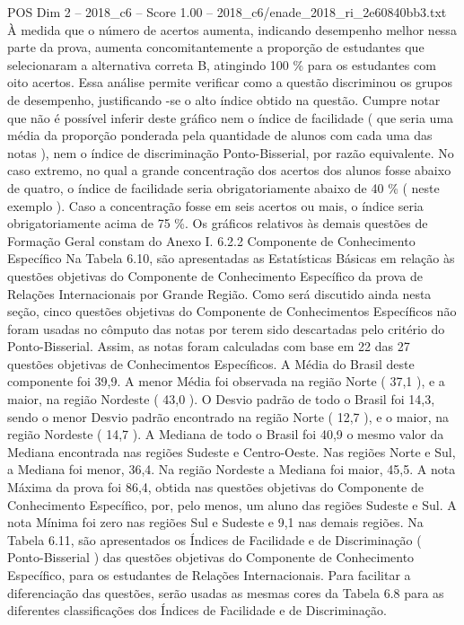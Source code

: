 \begin{textsample}{POS Dim 2 – 2018\_c6 – Score 1.00 – 2018\_c6/enade\_2018\_ri\_2e60840bb3.txt}
À medida que o número de acertos aumenta, indicando desempenho melhor nessa parte da prova, aumenta concomitantemente a proporção de estudantes que selecionaram a alternativa correta B, atingindo 100 \% para os estudantes com oito acertos.
Essa análise permite verificar como a questão discriminou os grupos de desempenho, justificando -se o alto índice obtido na questão.
Cumpre notar que não é possível inferir deste gráfico nem o índice de facilidade ( que seria uma média da proporção ponderada pela quantidade de alunos com cada uma das notas ), nem o índice de discriminação Ponto-Bisserial, por razão equivalente.
No caso extremo, no qual a grande concentração dos acertos dos alunos fosse abaixo de quatro, o índice de facilidade seria obrigatoriamente abaixo de 40 \% ( neste exemplo ).
Caso a concentração fosse em seis acertos ou mais, o índice seria obrigatoriamente acima de 75 \%.
Os gráficos relativos às demais questões de Formação Geral constam do Anexo I. 6.2.2 Componente de Conhecimento Específico Na Tabela 6.10, são apresentadas as Estatísticas Básicas em relação às questões objetivas do Componente de Conhecimento Específico da prova de Relações Internacionais por Grande Região.
Como será discutido ainda nesta seção, cinco questões objetivas do Componente de Conhecimentos Específicos não foram usadas no cômputo das notas por terem sido descartadas pelo critério do Ponto-Bisserial.
Assim, as notas foram calculadas com base em 22 das 27 questões objetivas de Conhecimentos Específicos.
A Média do Brasil deste componente foi 39,9.
A menor Média foi observada na região Norte ( 37,1 ), e a maior, na região Nordeste ( 43,0 ).
O Desvio padrão de todo o Brasil foi 14,3, sendo o menor Desvio padrão encontrado na região Norte ( 12,7 ), e o maior, na região Nordeste ( 14,7 ).
A Mediana de todo o Brasil foi 40,9 o mesmo valor da Mediana encontrada nas regiões Sudeste e Centro-Oeste.
Nas regiões Norte e Sul, a Mediana foi menor, 36,4.
Na região Nordeste a Mediana foi maior, 45,5.
A nota Máxima da prova foi 86,4, obtida nas questões objetivas do Componente de Conhecimento Específico, por, pelo menos, um aluno das regiões Sudeste e Sul.
A nota Mínima foi zero nas regiões Sul e Sudeste e 9,1 nas demais regiões.
Na Tabela 6.11, são apresentados os Índices de Facilidade e de Discriminação ( Ponto-Bisserial ) das questões objetivas do Componente de Conhecimento Específico, para os estudantes de Relações Internacionais.
Para facilitar a diferenciação das questões, serão usadas as mesmas cores da Tabela 6.8 para as diferentes classificações dos Índices de Facilidade e de Discriminação.

\end{textsample}
